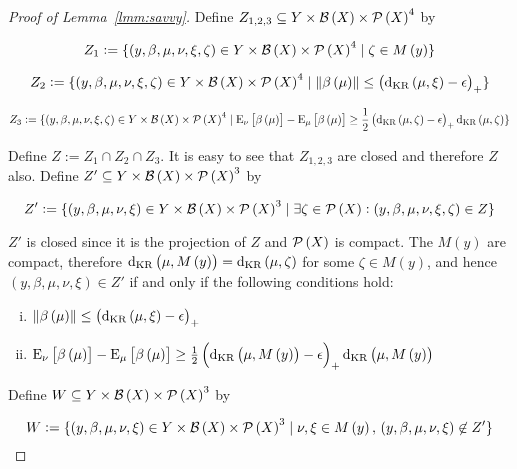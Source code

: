 \begin{proof}[Proof of Lemma~\ref{lmm:savvy}]

Define $Z_{1,2,3} \subseteq Y \times \mathcal{B}\left(X\right) \times \mathcal{P}\left(X\right)^4$ by

$$Z_1:=\{\left(y,\beta,\mu,\nu,\xi,\zeta\right) \in Y \times \mathcal{B}\left(X\right) \times \mathcal{P}\left(X\right)^4 \mid \zeta \in M\left(y\right)\}$$

$$Z_2:=\{\left(y,\beta,\mu,\nu,\xi,\zeta\right) \in Y \times \mathcal{B}\left(X\right) \times \mathcal{P}\left(X\right)^4 \mid \lVert \beta\left(\mu\right) \rVert \leq \left(\operatorname{d}_{\textnormal{KR}}\left(\mu,\xi\right) - \epsilon\right)_+\}$$

$$Z_3:=\{\left(y,\beta,\mu,\nu,\xi,\zeta\right) \in Y \times \mathcal{B}\left(X\right) \times \mathcal{P}\left(X\right)^4 \mid \operatorname{E}_\nu\left[\beta\left(\mu\right)\right] - \operatorname{E}_\mu\left[\beta\left(\mu\right)\right] \geq \frac{1}{2}\left(\operatorname{d}_{\textnormal{KR}}\left(\mu,\zeta\right) - \epsilon\right)_+ \operatorname{d}_{\textnormal{KR}}\left(\mu,\zeta\right)\}$$

Define $Z := Z_1 \cap Z_2 \cap Z_3$. It is easy to see that $Z_{1,2,3}$ are closed and therefore $Z$ also. Define $Z' \subseteq Y \times \mathcal{B}\left(X\right) \times \mathcal{P}\left(X\right)^3$ by

$$Z':=\{\left(y,\beta,\mu,\nu,\xi\right) \in Y \times \mathcal{B}\left(X\right) \times \mathcal{P}\left(X\right)^3 \mid \exists \zeta \in \mathcal{P}\left(X\right): \left(y,\beta,\mu,\nu,\xi,\zeta\right) \in Z\}$$

$Z'$ is closed since it is the projection of $Z$ and $\mathcal{P}\left(X\right)$ is compact. The $M\left(y\right)$ are compact, therefore $\operatorname{d}_{\textnormal{KR}}\left(\mu,M\left(y\right)\right)=\operatorname{d}_{\textnormal{KR}}\left(\mu,\zeta\right)$ for some $\zeta \in M\left(y\right)$, and hence $\left(y,\beta,\mu,\nu,\xi\right) \in Z'$ if and only if the following conditions hold:

\begin{enumerate}[i.]

\item $\lVert \beta\left(\mu\right) \rVert \leq \left(\operatorname{d}_{\textnormal{KR}}\left(\mu,\xi\right) - \epsilon\right)_+$
\item $\operatorname{E}_\nu\left[\beta\left(\mu\right)\right] - \operatorname{E}_\mu\left[\beta\left(\mu\right)\right] \geq \frac{1}{2}\left(\operatorname{d}_{\textnormal{KR}}\left(\mu,M\left(y\right)\right) - \epsilon\right)_+ \operatorname{d}_{\textnormal{KR}}\left(\mu,M\left(y\right)\right)$

\end{enumerate}

Define $W \subseteq Y \times \mathcal{B}\left(X\right) \times \mathcal{P}\left(X\right)^3$ by

$$W:=\{\left(y,\beta,\mu,\nu,\xi\right) \in Y \times \mathcal{B}\left(X\right) \times \mathcal{P}\left(X\right)^3 \mid \nu,\xi \in M\left(y\right),\, \left(y,\beta,\mu,\nu,\xi\right) \not\in Z'\}$$


\end{proof}
